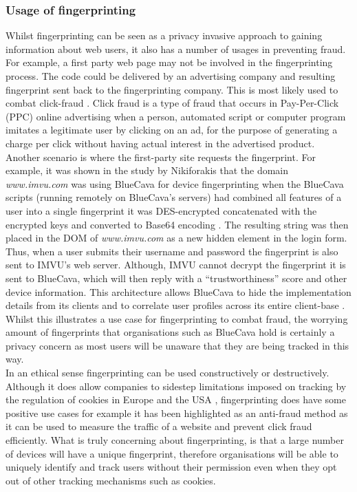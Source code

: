 \documentclass[12pt]{article}
\begin{document}
\subsubsection{Usage of fingerprinting}
Whilst fingerprinting can be seen as a privacy invasive approach to gaining information about web users, it also has a number of usages in preventing fraud. For example, a first party web page may not be involved in the fingerprinting process. The code could be delivered by an advertising company and resulting fingerprint sent back to the fingerprinting company. This is most likely used to combat click-fraud \parencite{cookielessMonster}. Click fraud is a type of fraud that occurs in Pay-Per-Click (PPC) online advertising when a person, automated script or computer program imitates a legitimate user by clicking on an ad, for the purpose of generating a charge per click without having actual interest in the advertised product. Another scenario is where the first-party site requests the fingerprint. For example, it was shown in the study by Nikiforakis that the domain \textit{www.imvu.com} was using BlueCava for device fingerprinting when the BlueCava scripts (running remotely on BlueCava's servers) had combined all features of a user into a single fingerprint it was DES-encrypted concatenated with the encrypted keys and converted to Base64 encoding \parencite{cookielessMonster}. The resulting string was then placed in the DOM of \textit{www.imvu.com} as a new hidden element in the login form. Thus, when a user submits their username and password the fingerprint is also sent to IMVU's web server. Although, IMVU cannot decrypt the fingerprint it is sent to BlueCava, which will then reply with a “trustworthiness” score and other device information. This architecture allows BlueCava to hide the implementation details from its clients and to correlate user profiles across its entire client-base \parencite{cookielessMonster}. Whilst this illustrates a use case for fingerprinting to combat fraud, the worrying amount of fingerprints that organisations such as BlueCava hold is certainly a privacy concern as most users will be unaware that they are being tracked in this way.  \\ 

In an ethical sense fingerprinting can be used constructively or destructively. Although it does allow companies to sidestep limitations imposed on tracking by the regulation of cookies in Europe and the USA \parencite{dustingFP}, fingerprinting does have some positive use cases for example it has been highlighted as an anti-fraud method as it can be used to measure the traffic of a website and prevent click fraud efficiently. What is truly concerning about fingerprinting, is that a large number of devices will have a unique fingerprint, therefore organisations will be able to uniquely identify and track users without their permission even when they opt out of other tracking mechanisms such as cookies. 
\end{document}
